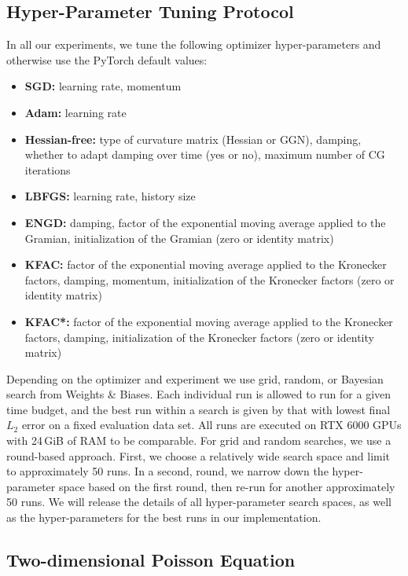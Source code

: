 \subsection{Hyper-Parameter Tuning Protocol}\label{sec:tuning-protocol}

In all our experiments, we tune the following optimizer hyper-parameters and otherwise use the PyTorch default values:
\begin{itemize}
\item \textbf{SGD:} learning rate, momentum
\item \textbf{Adam:} learning rate
\item \textbf{Hessian-free:} type of curvature matrix (Hessian or GGN), damping, whether to adapt damping over time (yes or no), maximum number of CG iterations
\item \textbf{LBFGS:} learning rate, history size
\item \textbf{ENGD:} damping, factor of the exponential moving average applied to the Gramian, initialization of the Gramian (zero or identity matrix)
\item \textbf{KFAC:} factor of the exponential moving average applied to the Kronecker factors, damping, momentum, initialization of the Kronecker factors (zero or identity matrix)
\item \textbf{KFAC*:} factor of the exponential moving average applied to the Kronecker factors, damping, initialization of the Kronecker factors (zero or identity matrix)
\end{itemize}

Depending on the optimizer and experiment we use grid, random, or Bayesian search from Weights \& Biases.
Each individual run is allowed to run for a given time budget, and the best run within a search is given by that with lowest final $L_2$ error on a fixed evaluation data set.
All runs are executed on RTX 6000 GPUs with 24\,GiB of RAM to be comparable.
For grid and random searches, we use a round-based approach.
First, we choose a relatively wide search space and limit to approximately 50 runs.
In a second, round, we narrow down the hyper-parameter space based on the first round, then re-run for another approximately 50 runs.
We will release the details of all hyper-parameter search spaces, as well as the hyper-parameters for the best runs in our implementation.

\subsection{Two-dimensional Poisson Equation}

